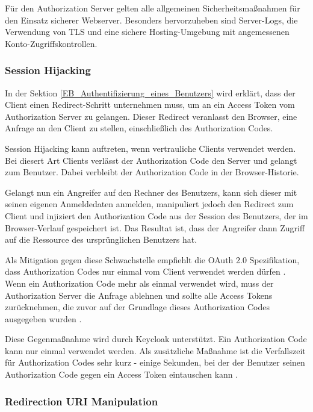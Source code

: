 Für den Authorization Server gelten alle allgemeinen Sicherheitsmaßnahmen für den Einsatz sicherer Webserver. Besonders hervorzuheben sind Server-Logs, die Verwendung von TLS und eine sichere Hosting-Umgebung mit angemessenen Konto-Zugriffskontrollen.

\subsubsection{Session Hijacking}

In der Sektion \ref{EB_Authentifizierung_eines_Benutzers} wird erklärt, dass der Client einen Redirect-Schritt unternehmen muss, um an ein Access Token vom Authorization Server zu gelangen. Dieser Redirect veranlasst den Browser, eine Anfrage an den Client zu stellen, einschließlich des Authorization Codes.

Session Hijacking kann auftreten, wenn vertrauliche Clients verwendet werden. Bei diesert Art Clients verlässt der Authorization Code den Server und gelangt zum Benutzer. Dabei verbleibt der Authorization Code in der Browser-Historie.

Gelangt nun ein Angreifer auf den Rechner des Benutzers, kann sich dieser mit seinen eigenen Anmeldedaten anmelden, manipuliert jedoch den Redirect zum Client und injiziert den Authorization Code aus der Session des Benutzers, der im Browser-Verlauf gespeichert ist. Das Resultat ist, dass der Angreifer dann Zugriff auf die Ressource des ursprünglichen Benutzers hat.

Als Mitigation gegen diese Schwachstelle empfiehlt die OAuth 2.0 Spezifikation, dass Authorization Codes nur einmal vom Client verwendet werden dürfen \cite{SSEB_OAuthAuthorizationResponse}. Wenn ein Authorization Code mehr als einmal verwendet wird, muss der Authorization Server die Anfrage ablehnen und sollte alle Access Tokens zurücknehmen, die zuvor auf der Grundlage dieses Authorization Codes ausgegeben wurden \cite{SSEB_OAuthAuthorizationResponse}.

Diese Gegenmaßnahme wird durch Keycloak unterstützt. Ein Authorization Code kann nur einmal verwendet werden. Als zusätzliche Maßnahme ist die Verfallszeit für Authorization Codes sehr kurz - einige Sekunden, bei der der Benutzer seinen Authorization Code gegen ein Access Token eintauschen kann \cite[Sec. 19]{SSEB_keycloakDocs}.

\subsubsection{Redirection URI Manipulation}

